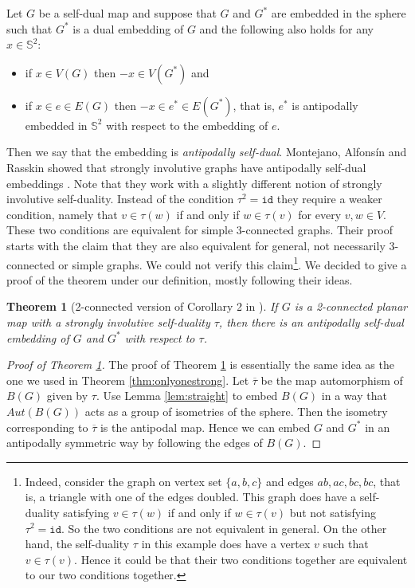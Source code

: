 \documentclass[10pt,a4paper]{article}
\newtheorem{theorem}{Theorem}[section]
\newcommand{\id}{\mathtt{id}}
\begin{document}
Let $G$ be a self-dual map and suppose that $G$ and $G^*$ are embedded in the sphere such that  $G^*$ is a dual embedding of $G$ and the following also holds for any $x \in \mathbb{S}^2$:

\begin{itemize}
    \item if $x \in V(G)$ then $-x \in V (G^*)$ and 
    \item if $x \in e \in E(G)$ then $-x \in e^{*} \in E(G^*)$, that is, $e^*$ is antipodally embedded in $\mathbb{S}^2$ with respect to the embedding of $e$.
\end{itemize}



Then we say that the embedding is \emph{antipodally self-dual}. Montejano, Alfonsín and Rasskin showed that strongly involutive graphs have antipodally self-dual embeddings \cite{montejano2022self}. Note that they work with a slightly different notion of strongly involutive self-duality. Instead of the condition $\tau^2=\id$ they require a weaker condition, namely that $v\in  \tau(w)$ if and only if $w\in\tau(v)$ for every $v,w\in V$. These two conditions are equivalent for simple 3-connected  graphs. Their proof starts with the claim that they are also equivalent for general, not necessarily 3-connected or simple graphs. We could not verify this claim\footnote{Indeed, consider the graph on vertex set $\{a,b,c\}$ and edges $ab,ac,bc,bc$, that is, a triangle with one of the edges doubled. This graph does have a self-duality satisfying $v\in \tau(w)$ if and only if $w\in\tau(v)$ but not satisfying $\tau^2=\id$. So the two conditions are not equivalent in general. On the other hand, the self-duality $\tau$ in this example does have a vertex $v$ such that $v\in\tau(v)$. Hence it could be that their two conditions together are equivalent to our two conditions together.}. We decided to give a proof of the theorem under our definition, mostly following their ideas.  


\begin{theorem}[2-connected version of Corollary 2 in \cite{montejano2022self}]\label{thm:strisantipodal}
If $G$ is a 2-connected planar map with a strongly involutive self-duality $\tau$, then there is an antipodally self-dual embedding of $G$ and $G^*$ with respect to $\tau$. 
\end{theorem}


\begin{proof}[Proof of Theorem \ref{thm:strisantipodal}]    
The proof of Theorem \ref{thm:strisantipodal} is essentially the same idea as the one we used in Theorem \ref{thm:onlyonestrong}. Let $\overline{\tau}$ be the map automorphism of $B(G)$ given by $\tau$. Use Lemma \ref{lem:straight} to embed $B(G)$ in a way that $Aut(B(G))$ acts as a group of isometries of the sphere. Then the isometry corresponding to $\overline{\tau}$ is the antipodal map. Hence we can embed $G$ and $G^*$ in an antipodally symmetric way by following the edges of $B(G)$.   
\end{proof}
\end{document}
